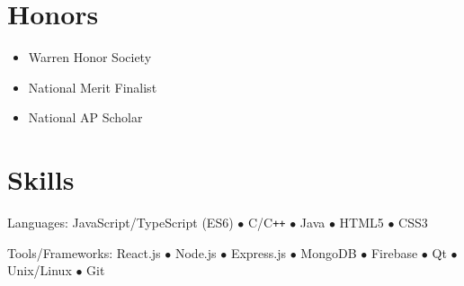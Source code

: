 \documentclass{article}
\begin{document}
\section*{Honors}
\begin{itemize}
  \setlength{\itemsep}{-2pt}
  \item Warren Honor Society
  \item National Merit Finalist
  \item National AP Scholar
\end{itemize}

\section*{Skills}
Languages: JavaScript/TypeScript (ES6) $\bullet{}$ C/C\verb!++! $\bullet$ Java $\bullet$ HTML5 $\bullet$ CSS3

Tools/Frameworks: React.js $\bullet$ Node.js $\bullet$ Express.js $\bullet$ MongoDB $\bullet$ Firebase $\bullet$ Qt $\bullet$ Unix/Linux $\bullet$ Git
\end{document}
